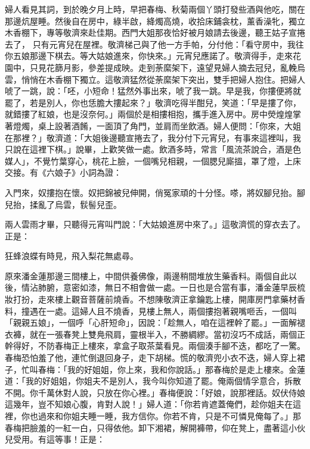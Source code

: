 \begin{showcontents}{}
婦人看見其詞，到於晚夕月上時，早把春梅、秋菊兩個丫頭打發些酒與他吃，關在那邊炕屋睡。然後自在房中，綠半啟，絳燭高燒，收拾床鋪衾枕，薰香澡牝，獨立木香棚下，專等敬濟來赴佳期。西門大姐那夜恰好被月娘請去後邊，聽王姑子宣捲去了，
只有元宵兒在屋裡。敬濟梯己與了他一方手帕，分付他：「看守房中，我往你五娘那邊下棋去。等大姑娘進來，你快來。」元宵兒應諾了。敬濟得手，走來花園中，只見花篩月影，參差提成映。走到荼縻架下，遠望見婦人摘去冠兒，亂輓烏雲，悄悄在木香棚下獨立。這敬濟猛然從荼縻架下突出，雙手把婦人抱住。把婦人唬了一跳，說：「呸，小短命！猛然外事出來，唬了我一跳。早是我，你摟便將就罷了，若是別人，你也恁膽大摟起來？」敬濟吃得半酣兒，笑道：「早是摟了你，就錯摟了紅娘，也是沒奈何。」兩個於是相摟相抱，攜手進入房中。房中熒煌煌掌著燈燭，桌上設著酒餚，一面頂了角門，並肩而坐飲酒。婦人便問：「你來，大姐在那裡？」敬濟道：「大姐後邊聽宣捲去了，我分付下元宵兒，有事來這裡叫，我只說在這裡下棋。」說畢，上歡笑做一處。飲酒多時，常言「風流茶說合，酒是色媒人」，不覺竹葉穿心，桃花上臉，一個嘴兒相親，一個腮兒廝搵，罩了燈，上床交接。有《六娘子》小詞為證：

入門來，奴摟抱在懷。奴把錦被兒伸開，俏冤家頑的十分怪。嗏，將奴腳兒抬。腳兒抬，揉亂了烏雲，䯼髻兒歪。

兩人雲雨才畢，只聽得元宵叫門說：「大姑娘進房中來了。」這敬濟慌的穿衣去了。正是：

狂蜂浪蝶有時見，飛入梨花無處尋。

原來潘金蓮那邊三間樓上，中間供養佛像，兩邊稍間堆放生藥香料。兩個自此以後，情沾肺腑，意密如漆，無日不相會做一處。一日也是合當有事，潘金蓮早辰梳妝打扮，走來樓上觀音菩薩前燒香。不想陳敬濟正拿鑰匙上樓，開庫房門拿藥材香料，撞遇在一處。這婦人且不燒香，見樓上無人，兩個摟抱著親嘴咂舌，一個叫「親親五娘」，一個呼「心肝短命」，因說：「趁無人，咱在這裡幹了罷。」一面解褪衣褲，就在一張春凳上雙鳧飛肩，靈根半入，不勝綢繆。當初沒巧不成話，兩個正幹得好，不防春梅正上樓來，拿盒子取茶葉看見。兩個湊手腳不迭，都吃了一驚。春梅恐怕羞了他，連忙倒退回身子，走下胡梯。慌的敬濟兜小衣不迭，婦人穿上裙子，忙叫春梅：「我的好姐姐，你上來，我和你說話。」那春梅於是走上樓來。金蓮道：「我的好姐姐，你姐夫不是別人，我今叫你知道了罷。俺兩個情孚意合，拆散不開。你千萬休對人說，只放在你心裡。」春梅便說：「好娘，說那裡話。奴伏侍娘這幾年，豈不知娘心腹，肯對人說！」婦人道：「你若肯遮蓋俺們，趁你姐夫在這裡，你也過來和你姐夫睡一睡，我方信你。你若不肯，只是不可憐見俺每了。」那春梅把臉羞的一紅一白，只得依他。卸下湘裙，解開褲帶，仰在凳上，盡著這小伙兒受用。有這等事！正是：


\end{showcontents}
